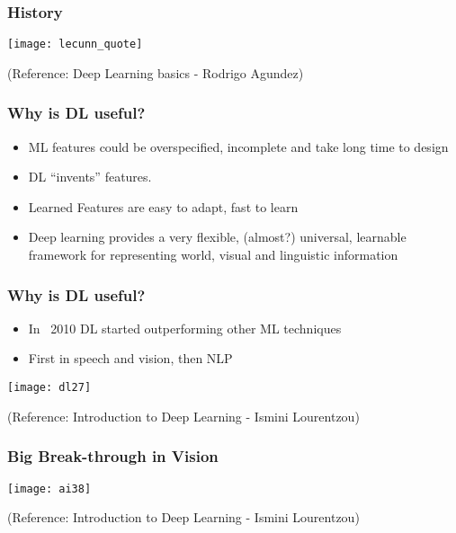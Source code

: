 \begin{frame}[fragile] \frametitle{History}
\begin{center}
\texttt{[image: lecunn\_quote]}
\end{center}

\tiny{(Reference: Deep Learning basics - Rodrigo Agundez)}
\end{frame}



\begin{frame}[fragile] \frametitle{Why is DL useful?}
\begin{itemize}
\item ML features could be overspecified, incomplete and take long time to design
\item DL ``invents'' features.
\item Learned Features are easy to adapt, fast to learn
\item Deep learning provides a very flexible, (almost?) universal, learnable framework for representing world, visual and linguistic information
\end{itemize}
\end{frame}

\begin{frame}[fragile] \frametitle{Why is DL useful?}
\begin{itemize}
\item In ~2010 DL started outperforming other ML techniques 
\item First in speech and vision, then NLP
\end{itemize}
\begin{center}
\texttt{[image: dl27]}
\end{center}
\tiny{(Reference: Introduction to Deep Learning - Ismini Lourentzou)}
\end{frame}

\begin{frame}[fragile] \frametitle{Big Break-through in Vision}
\begin{center}
\texttt{[image: ai38]}
\end{center}
\tiny{(Reference: Introduction to Deep Learning - Ismini Lourentzou)}
\end{frame}

